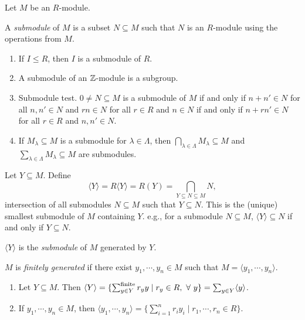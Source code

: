 \noindent Let $M$ be an $R$-module. 

\begin{definition}\label{5.3}
    A \emph{submodule} of $M$ is a subset $N \subseteq M$ such that $N$ is an $R$-module using the operations from $M$.
\end{definition}

\begin{example}\label{5.4}
    \begin{enumerate}
        \item If $I \leq R$, then $I$ is a submodule of $R$.
        \item A submodule of an $\mathbb{Z}$-module is a subgroup.
        \item Submodule test. $0 \neq N \subseteq M$ is a submodule of $M$ if and only if $n + n' \in N$ for all $n,n' \in N$ and $rn \in N$ for all $r \in R$ and $n \in N$ if and only if $n+rn' \in N$ for all $r \in R$ and $n,n' \in N$.
        \item If $M_\lambda \subseteq M$ is a submodule for $\lambda \in \Lambda$, then $\bigcap_{\lambda \in \Lambda} M_\lambda \subseteq M$ and $\sum_{\lambda \in \Lambda} M_\lambda \subseteq M$ are submodules.
    \end{enumerate}
\end{example}

\begin{definition}\label{5.5}
    Let $Y \subseteq M$. Define
    \[\langle Y \rangle = R\langle Y \rangle = R(Y) = \bigcap_{Y \subseteq N \subseteq M}N,\]
    intersection of all submodules $N \subseteq M$ such that $Y \subseteq N$. This is the (unique) smallest submodule of $M$ containing $Y$. e.g., for a submodule $N \subseteq M$, $\langle Y \rangle \subseteq N$ if and only if $Y \subseteq N$. \par
    $\langle Y \rangle$ is the \emph{submodule} of $M$ generated by $Y$. \par 
    $M$ is \emph{finitely generated} if there exist $y_1,\cdots,y_n \in M$ such that $M = \langle y_1,\cdots,y_n \rangle$. 
\end{definition}

\begin{fact}\label{5.6}
    \begin{enumerate}
        \item Let $Y \subseteq M$. Then $\langle Y \rangle = \{\sum_{y \in Y}^{\text{finite}} r_yy \mid r_y \in R, \ \forall \  y\} = \sum_{y \in Y} \langle y \rangle$.
        \item If $y_1,\cdots,y_n \in M$, then $\langle y_1,\cdots,y_n \rangle = \{\sum_{i=1}^{n} r_iy_i \mid r_1,\cdots,r_n \in R\}$.
    \end{enumerate}
\end{fact}

